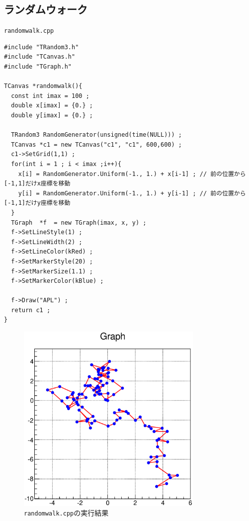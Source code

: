 \documentclass{jarticle}
\begin{document}
\subsection{ランダムウォーク}
 \begin{itembox}{\texttt{randomwalk.cpp}}
\begin{verbatim}
#include "TRandom3.h"
#include "TCanvas.h"
#include "TGraph.h"

TCanvas *randomwalk(){
  const int imax = 100 ;
  double x[imax] = {0.} ;
  double y[imax] = {0.} ;

  TRandom3 RandomGenerator(unsigned(time(NULL))) ;
  TCanvas *c1 = new TCanvas("c1", "c1", 600,600) ;
  c1->SetGrid(1,1) ;  
  for(int i = 1 ; i < imax ;i++){
    x[i] = RandomGenerator.Uniform(-1., 1.) + x[i-1] ; // 前の位置から[-1,1]だけx座標を移動
    y[i] = RandomGenerator.Uniform(-1., 1.) + y[i-1] ; // 前の位置から[-1,1]だけy座標を移動
  }
  TGraph  *f  = new TGraph(imax, x, y) ;
  f->SetLineStyle(1) ;
  f->SetLineWidth(2) ;
  f->SetLineColor(kRed) ;
  f->SetMarkerStyle(20) ;
  f->SetMarkerSize(1.1) ;
  f->SetMarkerColor(kBlue) ;

  f->Draw("APL") ;
  return c1 ;
}
\end{verbatim}
  \end{itembox}
 \begin{figure}[htbp]
  \begin{center}
   \includegraphics[width = 90mm]{./picture/randomwalkcanvas1.eps}
  \end{center}
  \caption{\texttt{randomwalk.cpp}の実行結果}
  \label{Fig:randomwalkcanvas1}
 \end{figure}
\end{document}

